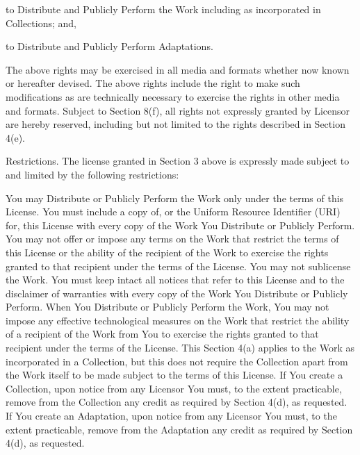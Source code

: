 \item
    to Distribute and Publicly Perform the Work including as incorporated
    in Collections; and,

\item
    to Distribute and Publicly Perform Adaptations.
\stopitemize

The above rights may be exercised in all media and formats whether now
known or hereafter devised. The above rights include the right to make
such modifications as are technically necessary to exercise the rights in
other media and formats. Subject to Section 8(f), all rights not expressly
granted by Licensor are hereby reserved, including but not limited to the
rights described in Section 4(e).

\item
Restrictions. The license granted in Section 3 above is expressly made
subject to and limited by the following restrictions:

\startitemize[a]
\item
    You may Distribute or Publicly Perform the Work only under the terms
    of this License. You must include a copy of, or the Uniform Resource
    Identifier (URI) for, this License with every copy of the Work You
    Distribute or Publicly Perform. You may not offer or impose any terms
    on the Work that restrict the terms of this License or the ability of
    the recipient of the Work to exercise the rights granted to that
    recipient under the terms of the License. You may not sublicense the
    Work. You must keep intact all notices that refer to this License and
    to the disclaimer of warranties with every copy of the Work You
    Distribute or Publicly Perform. When You Distribute or Publicly
    Perform the Work, You may not impose any effective technological
    measures on the Work that restrict the ability of a recipient of the
    Work from You to exercise the rights granted to that recipient under
    the terms of the License. This Section 4(a) applies to the Work as
    incorporated in a Collection, but this does not require the Collection
    apart from the Work itself to be made subject to the terms of this
    License. If You create a Collection, upon notice from any Licensor You
    must, to the extent practicable, remove from the Collection any credit
    as required by Section 4(d), as requested. If You create an
    Adaptation, upon notice from any Licensor You must, to the extent
    practicable, remove from the Adaptation any credit as required by
    Section 4(d), as requested.

